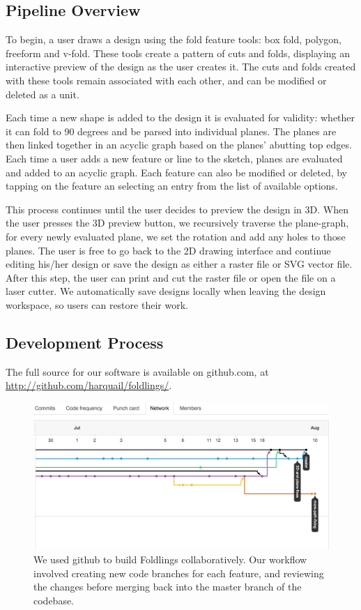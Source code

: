 \subsection{Pipeline Overview}\label{pipeline-overview}

To begin, a user draws a design using the fold feature tools: box fold,
polygon, freeform and v-fold. These tools create a pattern of cuts and
folds, displaying an interactive preview of the design as the user
creates it. The cuts and folds created with these tools remain
associated with each other, and can be modified or deleted as a unit.

Each time a new shape is added to the design it is evaluated for
validity: whether it can fold to 90 degrees and be parsed into
individual planes. The planes are then linked together in an acyclic
graph based on the planes' abutting top edges. Each time a user adds a
new feature or line to the sketch, planes are evaluated and added to an
acyclic graph. Each feature can also be modified or deleted, by tapping
on the feature an selecting an entry from the list of available options.

This process continues until the user decides to preview the design in
3D. When the user presses the 3D preview button, we recursively traverse
the plane-graph, for every newly evaluated plane, we set the rotation
and add any holes to those planes. The user is free to go back to the 2D
drawing interface and continue editing his/her design or save the design
as either a raster file or SVG vector file. After this step, the user
can print and cut the raster file or open the file on a laser cutter. We
automatically save designs locally when leaving the design workspace, so
users can restore their work.

\subsection{Development Process}\label{development-process}

The full source for our software is available on github.com, at
\url{http://github.com/harquail/foldlings/}.

\begin{figure}[htbp]
\centering
\includegraphics{figures/30_UI_Design_Philosophy/gitflow.png}
\caption{We used github to build Foldlings collaboratively. Our workflow
involved creating new code branches for each feature, and reviewing the
changes before merging back into the master branch of the codebase.}
\end{figure}
